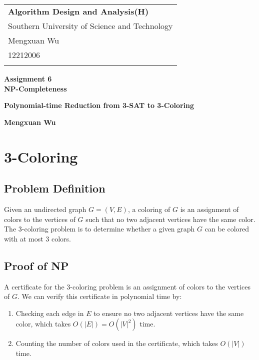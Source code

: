 \documentclass[a4paper,12pt]{article}
\begin{document}
\thispagestyle{empty} %

\begin{tabular}{p{15.5cm}}
{\large \bf Algorithm Design and Analysis(H)} \\
Southern University of Science and Technology \\ Mengxuan Wu \\ 12212006 \\
\hline
\\
\end{tabular}

\begin{center}
	{\Large \bf Assignment 6 \\ NP-Completeness}
	\vspace{2mm}

	{\bf Polynomial-time Reduction from 3-SAT to 3-Coloring}
	\vspace{2mm}

	{\bf Mengxuan Wu}
		
\end{center}

\section{3-Coloring}

\subsection{Problem Definition}

Given an undirected graph $G = (V, E)$, a coloring of $G$ is an assignment of colors to the vertices of $G$ such that no two adjacent vertices have the same color. 
The 3-coloring problem is to determine whether a given graph $G$ can be colored with at most 3 colors.

\subsection{Proof of NP}

A certificate for the 3-coloring problem is an assignment of colors to the vertices of $G$. 
We can verify this certificate in polynomial time by:
\begin{enumerate}
	\item Checking each edge in $E$ to ensure no two adjacent vertices have the same color, which takes $O(|E|) = O(|V|^2)$ time.
	\item Counting the number of colors used in the certificate, which takes $O(|V|)$ time.
\end{enumerate}
\end{document}

